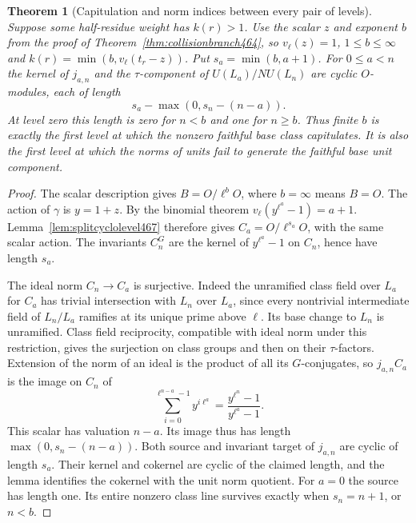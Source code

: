 \documentclass[a4paper,11pt]{article}
\newtheorem{theorem}[proposition]{Theorem}
\theoremstyle{definition}
\theoremstyle{remark}
\numberwithin{equation}{section}
\begin{document}
\begin{theorem}[Capitulation and norm indices between every pair of levels]\leavevmode
\label{thm:unitlength505}
Suppose some half-residue weight has \(k(r)>1\). Use the
scalar \(z\) and exponent \(b\) from the proof of
Theorem~\ref{thm:collisionbranch464}, so \(v_\ell(z)=1\),
\(1\le b\le\infty\) and \(k(r)=\min(b,v_\ell(t_r-z))\).
Put \(s_a=\min(b,a+1)\). For \(0\le a<n\) the kernel of
\(j_{a,n}\) and the \(\tau\)-component of \(U(L_a)/N U(L_n)\)
are cyclic \(O\)-modules, each of length
\[
                s_a-\max(0,s_n-(n-a)).
\]
At level zero this length is zero for \(n<b\) and one for
\(n\ge b\). Thus finite \(b\) is exactly the first level at
which the nonzero faithful base class capitulates. It is also
the first level at which the norms of units fail to generate
the faithful base unit component.
\end{theorem}
\begin{proof}
The scalar description gives \(B=O/\ell^bO\), where \(b=\infty\)
means \(B=O\). The action of \(\gamma\) is \(y=1+z\).
By the binomial theorem \(v_\ell(y^{\ell^a}-1)=a+1\).
Lemma~\ref{lem:splitcyclolevel467} therefore gives
\(C_a=O/\ell^{s_a}O\), with the same scalar action.
The invariants \(C_n^G\) are the kernel of \(y^{\ell^a}-1\)
on \(C_n\), hence have length \(s_a\).

The ideal norm \(C_n\to C_a\) is surjective. Indeed the
unramified class field over \(L_a\) for \(C_a\) has trivial
intersection with \(L_n\) over \(L_a\), since every nontrivial
intermediate field of \(L_n/L_a\) ramifies at its unique
prime above \(\ell\). Its base change to \(L_n\) is unramified.
Class field reciprocity, compatible with ideal norm under this
restriction, gives the surjection on class groups and then on
their \(\tau\)-factors. Extension of the norm of an ideal is
the product of all its \(G\)-conjugates, so \(j_{a,n}C_a\)
is the image on \(C_n\) of
\[
    \sum_{i=0}^{\ell^{n-a}-1}y^{i\ell^a}
              =\frac{y^{\ell^n}-1}{y^{\ell^a}-1}.
\]
This scalar has valuation \(n-a\). Its image thus has length
\(\max(0,s_n-(n-a))\). Both source and invariant target of
\(j_{a,n}\) are cyclic of length \(s_a\). Their kernel and
cokernel are cyclic of the claimed length, and the lemma
identifies the cokernel with the unit norm quotient. For
\(a=0\) the source has length one. Its entire nonzero class
line survives exactly when \(s_n=n+1\), or \(n<b\).
\end{proof}
\end{document}
